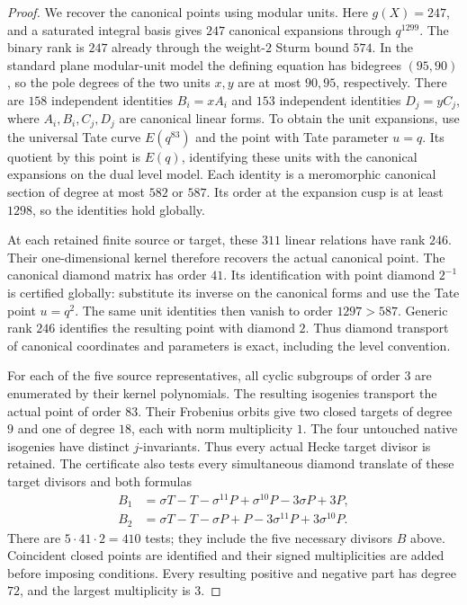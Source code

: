 \begin{proof}
We recover the canonical points using modular units.
Here $g(X)=247$, and a saturated integral basis gives $247$
canonical expansions through $q^{1299}$.
The binary rank is $247$ already through the weight-$2$ Sturm bound
$574$. In the standard plane modular-unit model the defining
equation has bidegrees $(95,90)$, so the pole degrees of the two
units $x,y$ are at most $90,95$, respectively.
There are $158$ independent identities $B_i=xA_i$ and $153$
independent identities $D_j=yC_j$, where $A_i,B_i,C_j,D_j$ are
canonical linear forms.
To obtain the unit expansions, use the universal Tate curve
$E(q^{83})$ and the point with Tate parameter $u=q$.
Its quotient by this point is $E(q)$, identifying these units with
the canonical expansions on the dual level model.
Each identity is a meromorphic canonical section of degree at most
$582$ or $587$. Its order at the expansion cusp is at least
$1298$, so the identities hold globally.

At each retained finite source or target, these $311$ linear
relations have rank $246$. Their one-dimensional kernel therefore
recovers the actual canonical point.
The canonical diamond matrix has order $41$.
Its identification with point diamond $2^{-1}$ is certified globally:
substitute its inverse on the canonical forms and use the Tate point
$u=q^2$. The same unit identities then vanish to order $1297>587$.
Generic rank $246$ identifies the resulting point with diamond $2$.
Thus diamond transport of canonical coordinates and parameters is
exact, including the level convention.

For each of the five source representatives, all cyclic subgroups
of order $3$ are enumerated by their kernel polynomials.
The resulting isogenies transport the actual point of order $83$.
Their Frobenius orbits give two closed targets of degree $9$ and
one of degree $18$, each with norm multiplicity $1$.
The four untouched native isogenies have distinct $j$-invariants.
Thus every actual Hecke target divisor is retained.
The certificate also tests every simultaneous diamond translate of
these target divisors and both formulas
\[
 \begin{split}
 B_1&=\sigma T-T-\sigma^{11}P+\sigma^{10}P-3\sigma P+3P,\\
 B_2&=\sigma T-T-\sigma P+P-3\sigma^{11}P+3\sigma^{10}P.
 \end{split}
\]
There are $5\cdot41\cdot2=410$ tests; they include the five
necessary divisors $B$ above.
Coincident closed points are identified and their signed
multiplicities are added before imposing conditions.
Every resulting positive and negative part has degree $72$, and
the largest multiplicity is $3$.


\end{proof}
